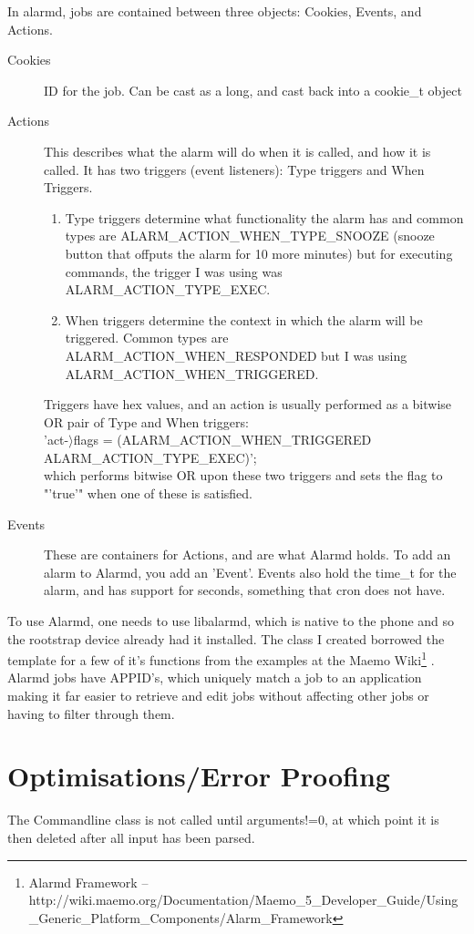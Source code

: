 In alarmd, jobs are contained between three objects: Cookies, Events, and Actions.
\begin{description}
  \item[Cookies] ID for the job. Can be cast as a long, and cast back into a cookie\_t object
  \item[Actions] This describes what the alarm will do when it is called, and how it is called. It has two triggers (event listeners): Type triggers and When Triggers.
\begin{enumerate}
\item Type triggers determine what functionality the alarm has and common types are ALARM\_ACTION\_WHEN\_TYPE\_SNOOZE (snooze button that offputs the alarm for 10 more minutes) but for executing commands, the trigger I was using was ALARM\_ACTION\_TYPE\_EXEC. 
\item When triggers determine the context in which the alarm will be triggered. Common types are ALARM\_ACTION\_WHEN\_RESPONDED but I was using ALARM\_ACTION\_WHEN\_TRIGGERED.
\end{enumerate}
Triggers have hex values, and an action is usually performed as a bitwise OR pair of Type and When triggers:\\
'act-\(\rangle\)flags \textbar= (ALARM\_ACTION\_WHEN\_TRIGGERED \textbar ALARM\_ACTION\_TYPE\_EXEC)';\\
which performs bitwise OR upon these two triggers and sets the flag to "'true'" when one of these is satisfied.
 \item[Events] These are containers for Actions, and are what Alarmd holds. To add an alarm to Alarmd, you add an 'Event'. Events also hold the time\_t for the alarm, and has support for  seconds, something that cron does not have.
\end{description}

To use Alarmd, one needs to use libalarmd, which is native to the phone and so the rootstrap device already had it installed. The class I created borrowed the template for a few of it's functions from the examples at the Maemo Wiki\footnote{Alarmd Framework -- http://wiki.maemo.org/Documentation/Maemo\_5\_Developer\_Guide/Using\_Generic\_Platform\_Components/Alarm\_Framework}
\label{ref:alarmdframe}. 
Alarmd jobs have APPID's, which uniquely match a job to an application making it far easier to retrieve and edit jobs without affecting other jobs or having to filter through them.

\section{Optimisations/Error Proofing}
The Commandline class is not called until arguments!=0, at which point it is then deleted after all input has been parsed.

